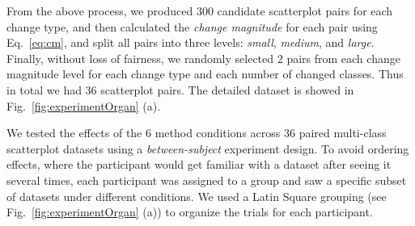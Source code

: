 {From the above process, we produced 300 candidate scatterplot pairs for each change type, and then calculated the \emph{change magnitude} for each pair using Eq.~\ref{eq:cm}, and split all  pairs into three levels: \emph{small}, \emph{medium}, and \emph{large}.
Finally, without loss of fairness, we randomly selected $2$ pairs from each change magnitude level for each change type and each number of changed classes. Thus in total we had $36$ scatterplot pairs. The detailed dataset is showed in Fig.~\ref{fig:experimentOrgan} (a).%
%
%
%

\vspace{.3em}
 We tested the effects of the $6$ method conditions across $36$ paired multi-class scatterplot datasets using a \emph{between-subject} experiment design. To avoid ordering effects, where the participant would get familiar with a dataset after seeing it several times, each participant was assigned to a group and saw a specific subset of datasets under different conditions. We used a Latin Square grouping (see Fig.~\ref{fig:experimentOrgan} (a)) to organize the trials for each participant. %

}
